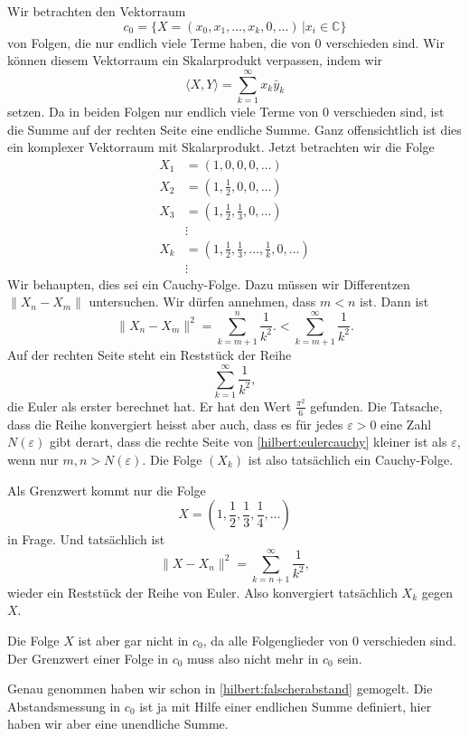 \begin{beispiel}
Wir betrachten den Vektorraum
\[
c_0 = \{ X=(x_0, x_1, \dots ,x_k,0,\dots)\,| x_i \in \mathbb C\}
\]
von Folgen, die nur endlich viele Terme haben, die von $0$ verschieden sind.
Wir können diesem Vektorraum ein Skalarprodukt verpassen, indem wir
\[
\langle X,Y\rangle
=
\sum_{k=1}^\infty x_k\bar{y}_k
\]
setzen.
Da in beiden Folgen nur endlich viele Terme von $0$ verschieden sind, ist
die Summe auf der rechten Seite eine endliche Summe.
Ganz offensichtlich ist dies ein komplexer Vektorraum mit Skalarprodukt.
Jetzt betrachten wir die Folge
\begin{align*}
X_1 &= (1,0,0,0,\dots)
\\
X_2 &= (1,\frac12,0,0,\dots)
\\
X_3 &= (1,\frac12,\frac13,0,\dots)
\\
&\vdots
\\
X_k &= (1,\frac12,\frac13,\dots,\frac1k,0,\dots)
\\
&\vdots
\end{align*}
Wir behaupten, dies sei ein Cauchy-Folge.
Dazu müssen wir Differentzen $\| X_n-X_m\|$ untersuchen.
Wir dürfen annehmen, dass $m < n$ ist.
Dann ist
\begin{equation}
\| X_n - X_m\|^2 = \sum_{k=m+1}^n \frac{1}{k^2}.
<
\sum_{k=m+1}^\infty \frac{1}{k^2}.
\label{hilbert:eulercauchy}
\end{equation}
Auf der rechten Seite steht ein Reststück der Reihe
\[
\sum_{k=1}^\infty \frac{1}{k^2},
\]
die Euler als erster berechnet hat.
Er hat den Wert $\frac{\pi^2}{6}$ gefunden.
Die Tatsache, dass die Reihe konvergiert heisst aber auch, dass
es für jedes $\varepsilon >0$ eine Zahl $N(\varepsilon)$ gibt derart,
dass die rechte Seite von \eqref{hilbert:eulercauchy} kleiner ist
als $\varepsilon$, wenn nur $m,n>N(\varepsilon)$.
Die Folge $(X_k)$ ist also tatsächlich ein Cauchy-Folge.

Als Grenzwert kommt nur die Folge 
\[
X = (1,\frac12, \frac13,\frac14,\dots)
\]
in Frage.
Und tatsächlich ist
\begin{equation}
\|X-X_n\|^2
=
\sum_{k=n+1}^\infty \frac1{k^2},
\label{hilbert:falscherabstand}
\end{equation}
wieder ein Reststück der Reihe von Euler.
Also konvergiert tatsächlich $X_k$ gegen $X$.

Die Folge $X$ ist aber gar nicht in $c_0$,
da alle Folgenglieder von $0$ verschieden sind.
Der Grenzwert einer Folge in $c_0$ muss also nicht mehr in $c_0$ sein.

Genau genommen haben wir schon in \eqref{hilbert:falscherabstand}
gemogelt.
Die Abstandsmessung in $c_0$ ist ja mit Hilfe einer endlichen Summe
definiert, hier haben wir aber eine unendliche Summe.
\end{beispiel}

